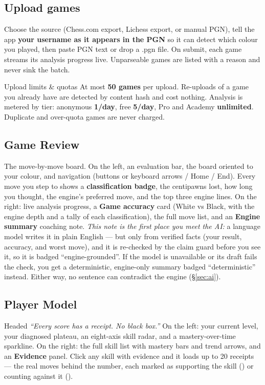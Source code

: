 \documentclass[11pt]{article}
\newcommand{\yes}{{\color{forestlt}\ding{52}}}    %
\newcommand{\no}{{\color{blunder}\ding{56}}}      %
\newcommand{\code}[1]{{\ttfamily #1}}
\begin{document}
\subsection{Upload games}

Choose the source (Chess.com export, Lichess export, or manual PGN), tell the
app \textbf{your username as it appears in the PGN} so it can detect which
colour you played, then paste PGN text or drop a \code{.pgn} file. On submit,
each game streams its analysis progress live. Unparseable games are listed with
a reason and never sink the batch.

\begin{rulebox}{Upload limits \& quotas}
At most \textbf{50 games} per upload. Re-uploads of a game you already have are
detected by content hash and cost nothing. Analysis is metered by tier:
anonymous \textbf{1/day}, free \textbf{5/day}, Pro and Academy \textbf{unlimited}.
Duplicate and over-quota games are never charged.
\end{rulebox}

\subsection{Game Review}

The move-by-move board. On the left, an evaluation bar, the board oriented to
your colour, and navigation (buttons or keyboard arrows / Home / End). Every
move you step to shows a \textbf{classification badge}, the centipawns lost, how
long you thought, the engine's preferred move, and the top three engine lines.
On the right: live analysis progress, a \textbf{Game accuracy} card (White vs
Black, with the engine depth and a tally of each classification), the full move
list, and an \textbf{Engine summary} coaching note. \emph{This note is the first
place you meet the AI:} a language model writes it in plain English --- but only
from verified facts (your result, accuracy, and worst move), and it is re-checked
by the claim guard before you see it, so it is badged ``engine-grounded''. If the
model is unavailable or its draft fails the check, you get a deterministic,
engine-only summary badged ``deterministic'' instead. Either way, no sentence can
contradict the engine (\S\ref{sec:ai}).

\subsection{Player Model}

Headed \emph{``Every score has a receipt. No black box.''} On the left: your
current level, your diagnosed plateau, an eight-axis skill radar, and a
mastery-over-time sparkline. On the right: the full skill list with mastery
bars and trend arrows, and an \textbf{Evidence} panel. Click any skill with
evidence and it loads up to 20 receipts --- the real moves behind the number,
each marked as supporting the skill (\yes) or counting against it
(\no).
\end{document}

